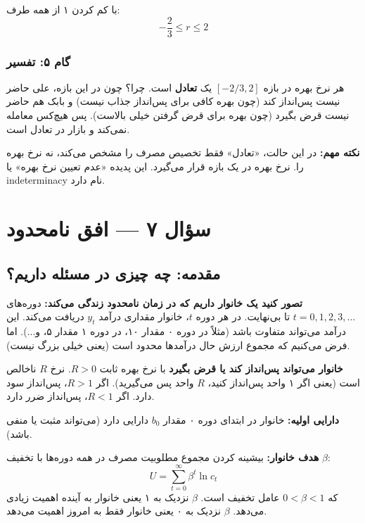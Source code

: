 \documentclass[12pt,a4paper]{article}
\begin{document}
با کم کردن ۱ از همه طرف:
\[
	\boxed{-\frac{2}{3} \leq r \leq 2}
\]

\subsubsection{گام ۵: تفسیر}

هر نرخ بهره در بازه $[-2/3, 2]$ یک \textbf{تعادل} است. چرا؟ چون در این بازه، علی حاضر نیست پس‌انداز کند (چون بهره کافی برای پس‌انداز جذاب نیست) و بابک هم حاضر نیست قرض بگیرد (چون بهره برای قرض گرفتن خیلی بالاست). پس هیچ‌کس معامله نمی‌کند و بازار در تعادل است.

\textbf{نکته مهم:} در این حالت، «تعادل» فقط تخصیص مصرف را مشخص می‌کند، نه نرخ بهره را. نرخ بهره در یک بازه قرار می‌گیرد. این پدیده «عدم تعیین نرخ بهره» یا indeterminacy نام دارد.

\section{سؤال ۷ — افق نامحدود}

\subsection{مقدمه: چه چیزی در مسئله داریم؟}

\textbf{تصور کنید یک خانوار داریم که در زمان نامحدود زندگی می‌کند:} دوره‌های $t = 0, 1, 2, 3, \ldots$ تا بی‌نهایت. در هر دوره $t$، خانوار مقداری درآمد $y_t$ دریافت می‌کند. این درآمد می‌تواند متفاوت باشد (مثلاً در دوره ۰ مقدار ۱۰، در دوره ۱ مقدار ۵، و...). اما فرض می‌کنیم که مجموع ارزش حال درآمدها محدود است (یعنی خیلی بزرگ نیست).

\textbf{خانوار می‌تواند پس‌انداز کند یا قرض بگیرد} با نرخ بهره ثابت $R > 0$. نرخ $R$ ناخالص است (یعنی اگر ۱ واحد پس‌انداز کنید، $R$ واحد پس می‌گیرید). اگر $R > 1$، پس‌انداز سود دارد. اگر $R < 1$، پس‌انداز ضرر دارد.

\textbf{دارایی اولیه:} خانوار در ابتدای دوره ۰ مقدار $b_0$ دارایی دارد (می‌تواند مثبت یا منفی باشد).

\textbf{هدف خانوار:} بیشینه کردن مجموع مطلوبیت مصرف در همه دوره‌ها با تخفیف $\beta$:
\[
	U = \sum_{t=0}^{\infty} \beta^t \ln c_t
\]
که $0 < \beta < 1$ عامل تخفیف است. $\beta$ نزدیک به ۱ یعنی خانوار به آینده اهمیت زیادی می‌دهد. $\beta$ نزدیک به ۰ یعنی خانوار فقط به امروز اهمیت می‌دهد.

\end{document}
